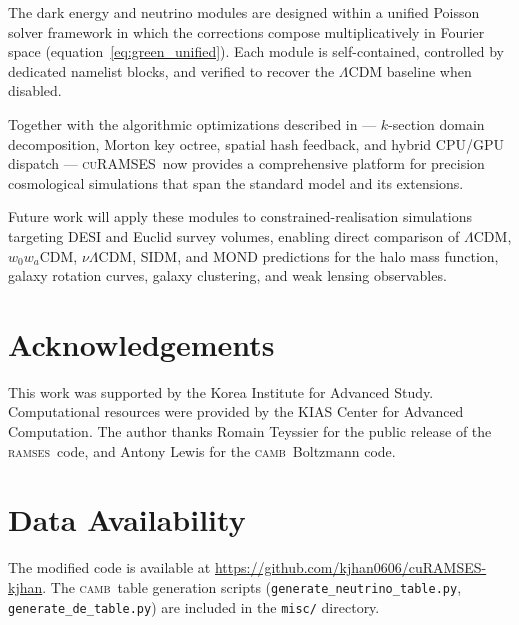 \documentclass[fleqn,usenatbib]{mnras}
\newcommand{\ramses}{\textsc{ramses}}
\newcommand{\curamses}{\textsc{cuRAMSES}}
\newcommand{\camb}{\textsc{camb}}
\newcommand{\code}[1]{\texttt{#1}}
\begin{document}
The dark energy and neutrino modules are designed within a unified
Poisson solver framework in which the corrections compose
multiplicatively in Fourier space (equation~\ref{eq:green_unified}).
Each module is self-contained, controlled by dedicated namelist
blocks, and verified to recover the $\Lambda$CDM baseline when
disabled.

Together with the algorithmic optimizations described in
\citet{Kim2026} --- $k$-section domain decomposition, Morton key
octree, spatial hash feedback, and hybrid CPU/GPU dispatch ---
\curamses\ now provides a comprehensive platform for precision
cosmological simulations that span the standard model and its
extensions.

Future work will apply these modules to constrained-realisation
simulations targeting DESI and Euclid survey volumes, enabling
direct comparison of $\Lambda$CDM, $w_0w_a$CDM, $\nu\Lambda$CDM,
SIDM, and MOND predictions for the halo mass function, galaxy
rotation curves, galaxy clustering, and weak lensing observables.


\section*{Acknowledgements}

This work was supported by the Korea Institute for Advanced Study.
Computational resources were provided by the KIAS Center for Advanced
Computation.  The author thanks Romain Teyssier for the public release
of the \ramses\ code, and Antony Lewis for the \camb\ Boltzmann code.


\section*{Data Availability}

The modified code is available at
\url{https://github.com/kjhan0606/cuRAMSES-kjhan}.  The \camb\ table
generation scripts (\code{generate\_neutrino\_table.py},
\code{generate\_de\_table.py}) are included in the \code{misc/}
directory.



\end{document}
